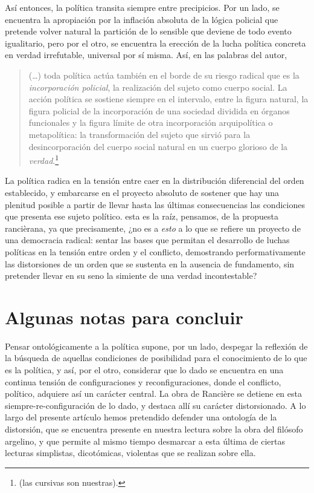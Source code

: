 Así entonces, la política transita siempre entre precipicios. Por un lado, se encuentra la apropiación por la inflación absoluta de la lógica policial que pretende volver natural la partición de lo sensible que deviene de todo evento igualitario, pero por el otro, se encuentra la erección de la lucha política concreta en verdad irrefutable, universal por sí misma. Así, en las palabras del autor,

\begin{quote}
(\ldots) toda política actúa también en el borde de su riesgo radical que es la \emph{incorporación policial}, la realización del sujeto como cuerpo social. La acción política se sostiene siempre en el intervalo, entre la figura natural, la figura policial de la incorporación de una sociedad dividida en órganos funcionales y la figura límite de otra incorporación arquipolítica o metapolítica: la transformación del sujeto que sirvió para la desincorporación del cuerpo social natural en un cuerpo glorioso de la \emph{verdad}.\footnote{\cite[][118]{@7064-RANCIERE2010} (las cursivas son nuestras).}
\end{quote}

La política radica en la tensión entre caer en la distribución diferencial del orden establecido, y embarcarse en el proyecto absoluto de sostener que hay una plenitud posible a partir de llevar hasta las últimas consecuencias las condiciones que presenta ese sujeto político. esta es la raíz, pensamos, de la propuesta rancièrana, ya que precisamente, ¿no es a \emph{esto} a lo que se refiere un proyecto de una democracia radical: sentar las bases que permitan el desarrollo de luchas políticas en la tensión entre orden y el conflicto, demostrando performativamente las distorsiones de un orden que se sustenta en la ausencia de fundamento, sin pretender llevar en su seno la simiente de una verdad incontestable?

\section{Algunas notas para concluir}


Pensar ontológicamente a la política supone, por un lado, despegar la reflexión de la búsqueda de aquellas condiciones de posibilidad para el conocimiento de lo que es la política, y así, por el otro, considerar que lo dado se encuentra en una continua tensión de configuraciones y reconfiguraciones, donde el conflicto, político, adquiere así un carácter central. La obra de Rancière se detiene en esta siempre-re-configuración de lo dado, y destaca allí su carácter distorsionado. A lo largo del presente artículo hemos pretendido defender una ontología de la distorsión, que se encuentra presente en nuestra lectura sobre la obra del filósofo argelino, y que permite al mismo tiempo desmarcar a esta última de ciertas lecturas simplistas, dicotómicas, violentas que se realizan sobre ella.

